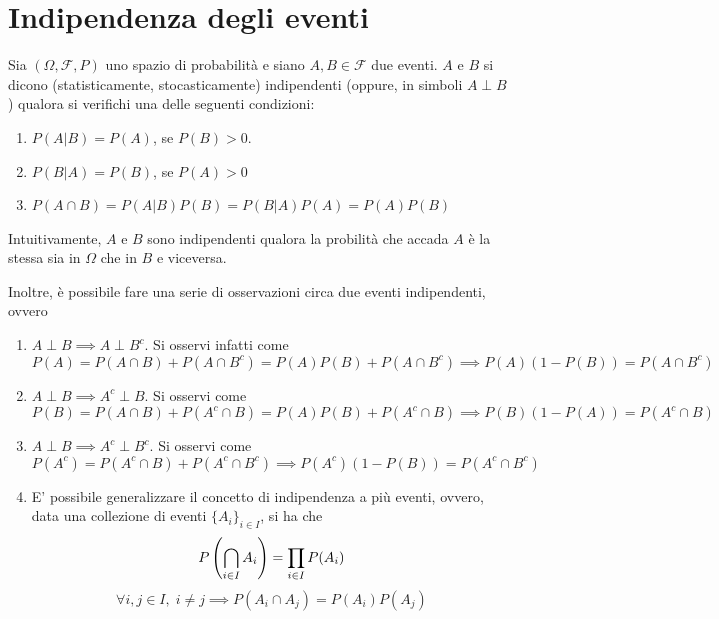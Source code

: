 \documentclass{article}
\begin{document}
    \newpage
    \section{Indipendenza degli eventi}
        Sia $(\Omega, \mathcal{F}, P)$ uno spazio di probabilità e siano $A, B \in \mathcal{F}$ due eventi. 
        $A$ e $B$ si dicono (statisticamente, stocasticamente) indipendenti (oppure, in simboli $A \perp B$) qualora si verifichi una delle seguenti condizioni:
        \begin{enumerate}
            \item $P(A | B) = P(A)$, se $P(B) > 0$. 
            \item $P(B | A) = P(B)$, se $P(A) > 0$
            \item $P(A \cap B) = P(A | B)P(B) = P(B | A)P(A) = P(A)P(B)$
        \end{enumerate}
        Intuitivamente, $A$ e $B$ sono indipendenti qualora la probilità che accada $A$ è la stessa sia in $\Omega$ che in $B$ e viceversa.

        \vspace{10pt}
        Inoltre, è possibile fare una serie di osservazioni circa due eventi indipendenti, ovvero
        \begin{enumerate}
            \item $A \perp B \implies A \perp B^{c}$. Si osservi infatti come 
            \[
                P(A) = P(A \cap B) + P(A \cap B^{c}) = P(A)P(B) + P(A \cap B^{c}) \implies P(A)(1 - P(B)) = P(A \cap B^{c})
            \]
            \item $A \perp B \implies A^{c} \perp B$. Si osservi come
            \[
                P(B) = P(A \cap B) + P(A^{c} \cap B) = P(A)P(B) + P(A^{c} \cap B) \implies P(B)(1 - P(A)) = P(A^{c} \cap B)
            \]
            \item $A \perp B \implies A^{c} \perp B^{c}$. Si osservi come
            \[
                P(A^{c}) = P(A^{c} \cap B) + P(A^{c} \cap B^{c}) \implies P(A^{c})(1 - P(B)) = P(A^{c} \cap B^{c})
            \]
            \item E' possibile generalizzare il concetto di indipendenza a più eventi, ovvero, data una collezione di eventi $\{A_{i}\}_{i \in I}$, si ha che
            \[
                P\qty(\bigcap_{i \in I} A_{i}) = \prod_{i \in I} P(A_{i})
            \]
            \[
                \forall i, j \in I, \; i \neq j \implies P(A_{i} \cap A_{j}) = P(A_{i})P(A_{j})
            \]
        \end{enumerate} 
\end{document}
